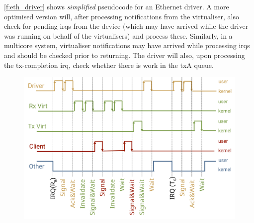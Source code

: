 \documentclass[a4paper,12pt]{report}
\newcommand{\Comment}[1]{\textbf{\textsl{#1}}}
\newcommand{\Comment}[1]{\relax}
\newcommand{\gernot}[1]{\Comment{#1 \colorbox{yellow}{[gernot]}}}
\begin{document}
\autoref{f:eth_driver} shows \emph{simplified} pseudocode for an Ethernet
driver.  A more optimised version will, after processing notifications
from the virtualiser, also check for pending \glspl{irq} from the device (which
may have arrived while the driver was running on behalf of the virtualisers)
and process these. Similarly, in a multicore system, virtualiser
notifications may have arrived while processing \glspl{irq} and should be
checked prior to returning. The driver will also, upon processing the
\gls{tx}-completion \gls{irq}, check whether there is work in the \gls{tx}A queue.


\begin{figure}[th]
  \centering
  \hspace*{\fill}
  \includegraphics[scale=0.15]{entries-active}
  \hspace{\fill}
  \hspace{\fill}

\end{figure}
\end{document}
